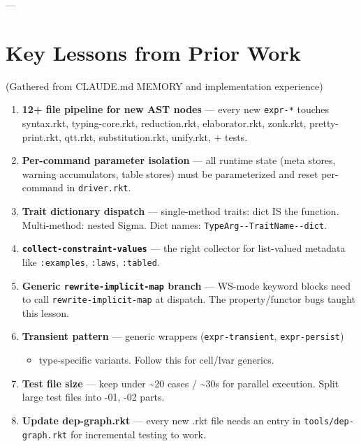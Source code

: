 \documentclass[11pt]{article}
\begin{document}
---
\section{Key Lessons from Prior Work}
\label{sec:orgaaab169}

(Gathered from CLAUDE.md MEMORY and implementation experience)

\begin{enumerate}
\item \textbf{12+ file pipeline for new AST nodes} — every new \texttt{expr-*} touches
syntax.rkt, typing-core.rkt, reduction.rkt, elaborator.rkt, zonk.rkt,
pretty-print.rkt, qtt.rkt, substitution.rkt, unify.rkt, + tests.

\item \textbf{Per-command parameter isolation} — all runtime state (meta stores,
warning accumulators, table stores) must be parameterized and reset
per-command in \texttt{driver.rkt}.

\item \textbf{Trait dictionary dispatch} — single-method traits: dict IS the function.
Multi-method: nested Sigma. Dict names: \texttt{TypeArg-{}-{}TraitName-{}-{}dict}.

\item \textbf{\texttt{collect-constraint-values}} — the right collector for list-valued
metadata like \texttt{:examples}, \texttt{:laws}, \texttt{:tabled}.

\item \textbf{Generic \texttt{rewrite-implicit-map} branch} — WS-mode keyword blocks need
to call \texttt{rewrite-implicit-map} at dispatch. The property/functor bugs
taught this lesson.

\item \textbf{Transient pattern} — generic wrappers (\texttt{expr-transient}, \texttt{expr-persist})
\begin{itemize}
\item type-specific variants. Follow this for cell/lvar generics.
\end{itemize}

\item \textbf{Test file size} — keep under \textasciitilde{}20 cases / \textasciitilde{}30s for parallel execution.
Split large test files into -01, -02 parts.

\item \textbf{Update dep-graph.rkt} — every new .rkt file needs an entry in
\texttt{tools/dep-graph.rkt} for incremental testing to work.
\end{enumerate}
\end{document}
